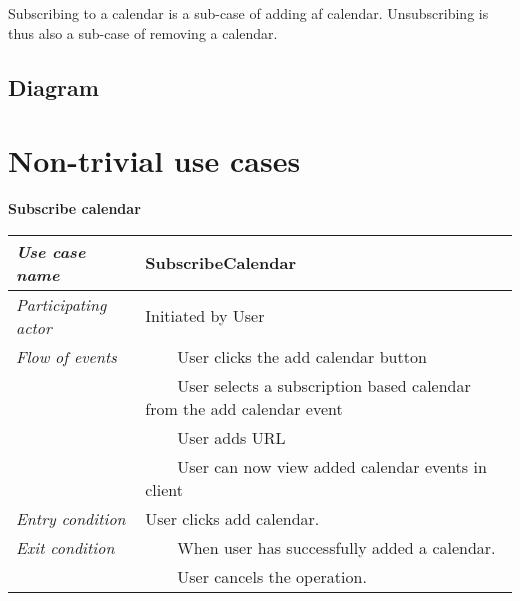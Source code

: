 \documentclass[10pt]{report}
\newcommand{\tabitem}{~~\llap{\textbullet}~~}
\numberwithin{equation}{section} %
\numberwithin{figure}{section} %
\numberwithin{table}{section} %
\begin{document}
Subscribing to a calendar is a sub-case of adding af calendar. Unsubscribing is
thus also a sub-case of removing a calendar.

\subsection{Diagram}

\section{Non-trivial use cases}
\begin{table}[H]
\noindent \textbf{Subscribe calendar}\\
\begin{tabularx}{\textwidth}{l X}
\midrule
\textit{Use case name} & SubscribeCalendar \\ \midrule
\textit{Participating actor} & Initiated by User \\ \midrule
\textit{Flow of events} & \tabitem User clicks the add calendar button\\
                                       & \tabitem User selects a subscription
                                       based calendar from the add calendar
                                       event\\
                                       & \tabitem User adds URL\\
                                       & \tabitem User can now view added calendar events
                                       in client\\
                        \midrule
\textit{Entry condition} & User clicks add calendar.\\ \midrule
\textit{Exit condition} & \tabitem When user has successfully added a calendar. \\
						& \tabitem User cancels the operation.\\
                        \midrule
\end{tabularx}
\end{table}
\end{document}
